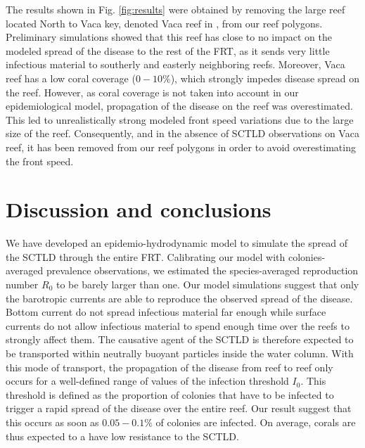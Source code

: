 \documentclass[utf8]{frontiersSCNS}
\begin{document}
The results shown in Fig. \ref{fig:results} were obtained by removing the large reef located North to Vaca key, denoted Vaca reef in \cite{frys20}, from our reef polygons. Preliminary simulations showed that this reef has close to no impact on the modeled spread of the disease to the rest of the FRT, as it sends very little infectious material to southerly and easterly neighboring reefs. Moreover, Vaca reef has a low coral coverage ($0-10\%$), which strongly impedes disease spread on the reef. However, as coral coverage is not taken into account in our epidemiological model, propagation of the disease on the reef was overestimated. This led to unrealistically strong modeled front speed variations due to the large size of the reef. Consequently, and in the absence of SCTLD observations on Vaca reef, it has been removed from our reef polygons in order to avoid overestimating the front speed.



\section{Discussion and conclusions}


We have developed an epidemio-hydrodynamic model to simulate the spread of the SCTLD through the entire FRT. Calibrating our model with colonies-averaged prevalence observations, we estimated the species-averaged reproduction number $R_0$ to be barely larger than one. Our model simulations suggest that only the barotropic currents are able to reproduce the observed spread of the disease. Bottom current do not spread infectious material far enough while surface currents do not allow infectious material to spend enough time over the reefs to strongly affect them. The causative agent of the SCTLD is therefore expected to be transported within neutrally buoyant particles inside the water column. With this mode of transport, the propagation of the disease from reef to reef only occurs for a well-defined range of values of the infection threshold $I_0$. This threshold is defined as the proportion of colonies that have to be infected to trigger a rapid spread of the disease over the entire reef. Our result suggest that this occurs as soon as $0.05-0.1\%$ of colonies are infected. On average, corals are thus expected to a have low resistance to the SCTLD.
\end{document}
